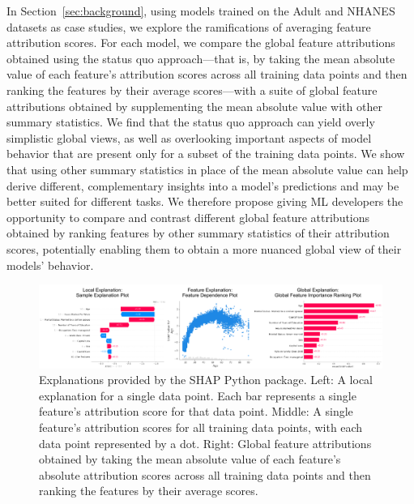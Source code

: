 \documentclass[11pt,dvipdfmx]{article}
\begin{document}
In Section~\ref{sec:background}, using models trained on the Adult
\citep{Adult} and NHANES \citep{NHANES} datasets as case studies, we
explore the ramifications of averaging feature attribution scores. For
each model, we compare the global feature attributions obtained using
the status quo approach---that is, by taking the mean absolute value
of each feature's attribution scores across all training data points
and then ranking the features by their average scores---with a suite
of global feature attributions obtained by supplementing the mean
absolute value with other summary statistics. We find that the status
quo approach can yield overly simplistic global views, as well as
overlooking important aspects of model behavior that are present only
for a subset of the training data points. We show that using other
summary statistics in place of the mean absolute value can help derive
different, complementary insights into a model's predictions and may
be better suited for different tasks. We therefore propose giving ML
developers the opportunity to compare and contrast different global
feature attributions obtained by ranking features by other summary
statistics of their attribution scores, potentially enabling them to
obtain a more nuanced global view of their models'
behavior.

\begin{figure}
    \centering
    \includegraphics[width=\linewidth, bb=0 0 572 140]{figs/local_to_global.pdf}
    \caption{Explanations provided by the SHAP Python package. Left: A
      local explanation for a single data point. Each bar represents a
      single feature's attribution score for that data point. Middle:
      A single feature's attribution scores for all training data
      points, with each data point represented by a dot. Right:
      Global feature attributions obtained by taking the mean absolute
      value of each feature's absolute attribution scores across all
      training data points and then ranking the features by their
      average scores.}
    \label{fig:local_to_global}
\end{figure}
\end{document}
